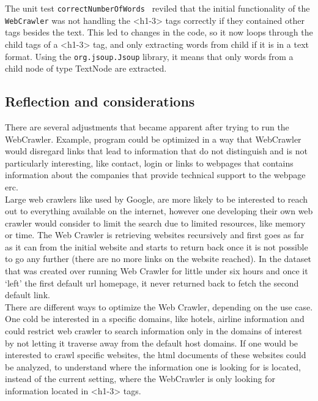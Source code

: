 The unit test {\tt correctNumberOfWords } reviled that the initial functionality of the {\tt WebCrawler} was not handling the <h1-3> tags correctly if they contained other tags besides the text. This led to changes in the code, so it now loops through the child tags of a <h1-3> tag, and only extracting words from child if it is in a text format. Using the {\tt org.jsoup.Jsoup} library, it means that only words from a child node of type TextNode are extracted.


\subsection{Reflection and considerations}
There are several adjustments that became apparent after trying to run the WebCrawler. Example, program could be optimized in a way that WebCrawler would disregard links that lead to information that do not distinguish and is not particularly interesting, like contact, login or links to webpages that contains information about the companies that provide technical support to the webpage erc.\\  
Large web crawlers like used by Google, are more likely to be interested to reach out to everything available on the internet, however one developing their own web crawler would consider to limit the search due to limited resources, like memory or time. The Web Crawler is retrieving websites recursively and first goes as far as it can from the initial website and starts to return back once it is not possible to go any further (there are no more links on the website reached). In the dataset that was created over running Web Crawler for little under six hours and once it ‘left’ the first default url homepage, it never returned back to fetch the second default link.\\
There are different ways to optimize the Web Crawler, depending on the use case. One cold be interested in a specific domains, like hotels, airline information and could restrict web crawler to search information only in the domains of interest by not letting it traverse away from the default host domains.
If one would be interested to crawl specific websites, the html documents of these websites could be analyzed, to understand where the information one is looking for is located, instead of the current setting, where the WebCrawler is only looking for information located in <h1-3> tags. 




